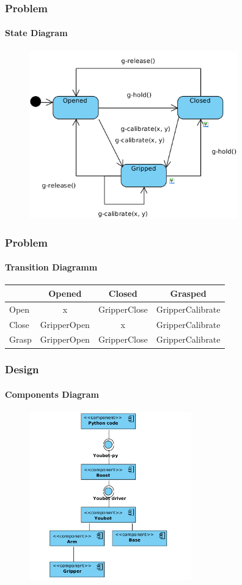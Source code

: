 \documentclass{beamer}
\begin{document}


\begin{frame}
 \frametitle{Problem}
 \framesubtitle{State Diagram}

 \begin{figure}[ht!]
  \centering
  \includegraphics[width=90mm]{img/statechart.png}
  \caption{}
  \label{State Diagram Of The Gripper}
  \end{figure} 
 \end{frame}
 
 
 \begin{frame}
 \frametitle{Problem}
 \framesubtitle{Transition Diagramm}
 \begin{tabular}{ l | c c c }
            & Opened & Closed & Grasped \\ \hline
  Open      & x & GripperClose & GripperCalibrate \\
  Close     & GripperOpen & x  & GripperCalibrate \\
  Grasp     & GripperOpen & GripperClose & GripperCalibrate \\
  
\end{tabular}

\end{frame}

\begin{frame}
 \frametitle{Design}
 \framesubtitle{Components Diagram}
  \begin{figure}[ht!]
  \centering
  \includegraphics[width=70mm]{img/components.png}
  \caption{}
  \label{Component Diagram}
  \end{figure} 
\end{frame}
\end{document}
